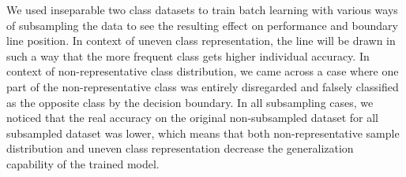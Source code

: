 \documentclass[a4paper]{article}
\begin{document}
\begin{table}[]
	\centering
	\caption{Sequential delta learning rule}
	\label{tab:pcn_delta_seq}
\end{table}

We used inseparable two class datasets to train batch learning with various ways of subsampling the data to see the resulting effect on performance and boundary line position. In context of uneven class representation, the line will be drawn in such a way that the more frequent class gets higher individual accuracy. In context of non-representative class distribution, we came across a case where one part of the non-representative class was entirely disregarded and falsely classified as the opposite class by the decision boundary.
In all subsampling cases, we noticed that the real accuracy on the original non-subsampled dataset for all subsampled dataset was lower, which means that both non-representative sample distribution and uneven class representation decrease the generalization capability of the trained model.

\end{document}
